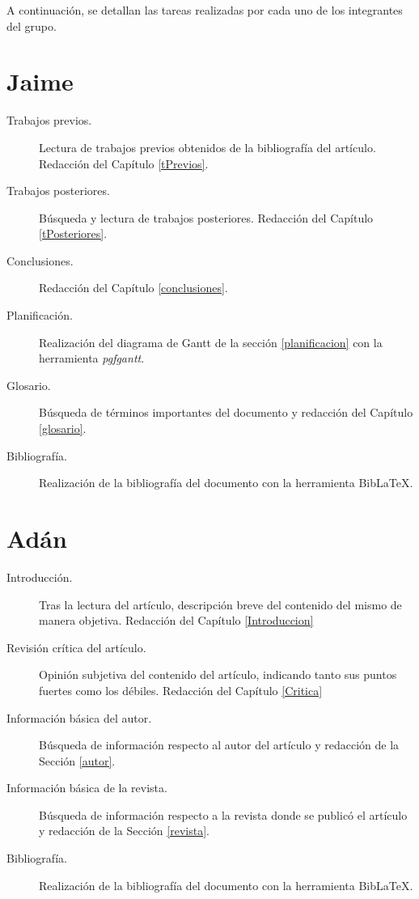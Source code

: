 \documentclass[a4paper,11pt]{report}
\begin{document}

A continuación, se detallan las tareas realizadas por cada uno de los integrantes del grupo.

\section*{Jaime}

\begin{description}
\item[Trabajos previos.] Lectura de trabajos previos obtenidos de la bibliografía del artículo. Redacción del Capítulo \ref{tPrevios}.
\item[Trabajos posteriores.] Búsqueda y lectura de trabajos posteriores. Redacción del Capítulo \ref{tPosteriores}.
\item[Conclusiones.] Redacción del Capítulo \ref{conclusiones}.
\item[Planificación.] Realización del diagrama de Gantt de la sección \ref{planificacion} con la herramienta \emph{pgfgantt}.
\item[Glosario.] Búsqueda de términos importantes del documento y redacción del Capítulo \ref{glosario}.
\item[Bibliografía.] Realización de la bibliografía del documento con la herramienta Bib\LaTeX.
\end{description}

\section*{Adán}

\begin{description}
\item[Introducción.] Tras la lectura del artículo, descripción breve del contenido del mismo de manera objetiva. Redacción del Capítulo \ref{Introduccion}
\item[Revisión crítica del artículo.] Opinión subjetiva del contenido del artículo, indicando tanto sus puntos fuertes como los débiles. Redacción del Capítulo \ref{Critica}
\item[Información básica del autor.] Búsqueda de información respecto al autor del artículo y redacción de la Sección \ref{autor}. 
\item[Información básica de la revista.] Búsqueda de información respecto a la revista donde se publicó el  artículo y redacción de la Sección \ref{revista}. 
\item[Bibliografía.] Realización de la bibliografía del documento con la herramienta Bib\LaTeX.
\end{description}
\end{document}
